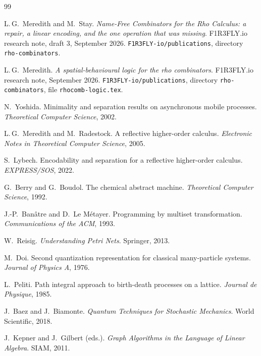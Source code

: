 \documentclass[11pt,a4paper]{article}
\theoremstyle{plain}
\theoremstyle{definition}
\theoremstyle{remark}
\begin{document}
\begin{thebibliography}{99}

L.\,G.\ Meredith and M.\ Stay.
\newblock \emph{Name-Free Combinators for the Rho Calculus: a repair, a linear
encoding, and the one operation that was missing}.
\newblock F1R3FLY.io research note, draft 3, September 2026.
\newblock \texttt{F1R3FLY-io/publications}, directory \texttt{rho-combinators}.

L.\,G.\ Meredith.
\newblock \emph{A spatial-behavioural logic for the rho combinators}.
\newblock F1R3FLY.io research note, September 2026.
\newblock \texttt{F1R3FLY-io/publications}, directory
\texttt{rho-combinators}, file \texttt{rhocomb-logic.tex}.

N.\ Yoshida.
\newblock Minimality and separation results on asynchronous mobile processes.
\newblock \emph{Theoretical Computer Science}, 2002.

L.\,G.\ Meredith and M.\ Radestock.
\newblock A reflective higher-order calculus.
\newblock \emph{Electronic Notes in Theoretical Computer Science}, 2005.

S.\ Lybech.
\newblock Encodability and separation for a reflective higher-order calculus.
\newblock \emph{EXPRESS/SOS}, 2022.

G.\ Berry and G.\ Boudol.
\newblock The chemical abstract machine.
\newblock \emph{Theoretical Computer Science}, 1992.

J.-P.\ Ban\^atre and D.\ Le M\'etayer.
\newblock Programming by multiset transformation.
\newblock \emph{Communications of the ACM}, 1993.

W.\ Reisig.
\newblock \emph{Understanding Petri Nets}.
\newblock Springer, 2013.

M.\ Doi.
\newblock Second quantization representation for classical many-particle
systems.
\newblock \emph{Journal of Physics A}, 1976.

L.\ Peliti.
\newblock Path integral approach to birth-death processes on a lattice.
\newblock \emph{Journal de Physique}, 1985.

J.\ Baez and J.\ Biamonte.
\newblock \emph{Quantum Techniques for Stochastic Mechanics}.
\newblock World Scientific, 2018.

J.\ Kepner and J.\ Gilbert (eds.).
\newblock \emph{Graph Algorithms in the Language of Linear Algebra}.
\newblock SIAM, 2011.


\end{thebibliography}
\end{document}
